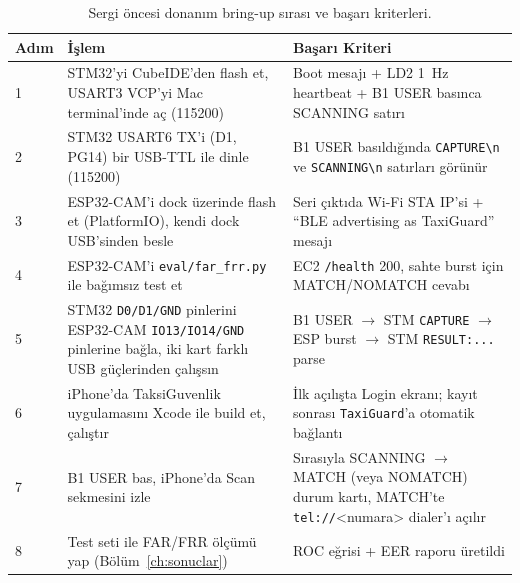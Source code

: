 \begin{table}[h!]
\centering
\caption{Sergi öncesi donanım bring-up sırası ve başarı kriterleri.}
\label{tab:bringup}
\small
\begin{tabularx}{\linewidth}{l X X}
\toprule
\textbf{Adım} & \textbf{İşlem} & \textbf{Başarı Kriteri}\\
\midrule
1 & STM32'yi CubeIDE'den flash et, USART3 VCP'yi Mac terminal'inde aç (115200) & Boot mesajı + LD2 1~Hz heartbeat + B1 USER basınca SCANNING satırı\\
2 & STM32 USART6 TX'i (D1, PG14) bir USB-TTL ile dinle (115200) & B1 USER basıldığında \texttt{CAPTURE\textbackslash n} ve \texttt{SCANNING\textbackslash n} satırları görünür\\
3 & ESP32-CAM'i dock üzerinde flash et (PlatformIO), kendi dock USB'sinden besle & Seri çıktıda Wi-Fi STA IP'si + ``BLE advertising as TaxiGuard'' mesajı\\
4 & ESP32-CAM'i \texttt{eval/far\_frr.py} ile bağımsız test et & EC2 \texttt{/health} 200, sahte burst için MATCH/NOMATCH cevabı\\
5 & STM32 \texttt{D0/D1/GND} pinlerini ESP32-CAM \texttt{IO13/IO14/GND} pinlerine bağla, iki kart farklı USB güçlerinden çalışsın & B1 USER $\rightarrow$ STM \texttt{CAPTURE} $\rightarrow$ ESP burst $\rightarrow$ STM \texttt{RESULT:...} parse\\
6 & iPhone'da TaksiGuvenlik uygulamasını Xcode ile build et, çalıştır & İlk açılışta Login ekranı; kayıt sonrası \texttt{TaxiGuard}'a otomatik bağlantı\\
7 & B1 USER bas, iPhone'da Scan sekmesini izle & Sırasıyla SCANNING $\rightarrow$ MATCH (veya NOMATCH) durum kartı, MATCH'te \texttt{tel://}<numara> dialer'ı açılır\\
8 & Test seti ile FAR/FRR ölçümü yap (Bölüm~\ref{ch:sonuclar}) & ROC eğrisi + EER raporu üretildi\\
\bottomrule
\end{tabularx}
\end{table}
